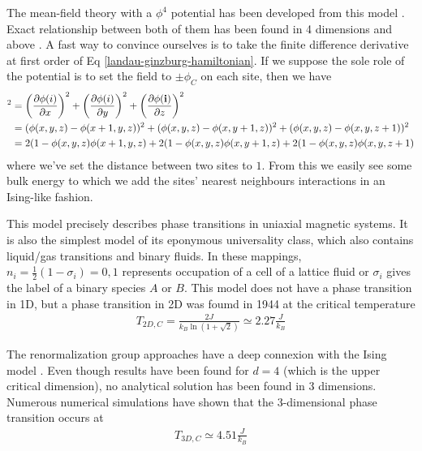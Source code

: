 The mean-field theory with a $\phi^4$ potential has been developed from this model \cite{le_bellac_equilibrium_2004}. Exact relationship between both of them has been found in 4 dimensions and above \cite{aizenman_proof_1981}. A fast way to convince ourselves is to take the finite difference derivative at first order of Eq \eqref{landau-ginzburg-hamiltonian}. If we suppose the sole role of the potential is to set the field to $\pm \phi_C$ on each site, then we have
\begin{align}
    [{\boldsymbol \nabla} \phi(i)]^2 &= \left( \frac{\partial \phi(i)}{\partial x} \right)^2  + \left( \frac{\partial \phi(i)}{\partial y} \right)^2 + \left( \frac{\partial \phi({\bf i})}{\partial z} \right)^2\nn
    &= (\phi(x,y,z)-\phi(x+1,y,z))^2 + (\phi(x,y,z)-\phi(x,y+1,z))^2 + (\phi(x,y,z)-\phi(x,y,z+1))^2 \nn
    &= 2 (1-\phi(x,y,z)\phi(x+1,y,z) + 2 (1-\phi(x,y,z)\phi(x,y+1,z) +2 (1-\phi(x,y,z)\phi(x,y,z+1) 
    \label{discretisation-landau}
\end{align}
where we've set the distance between two sites to $1$.
From this we easily see some bulk energy to which we add the sites' nearest neighbours interactions in an Ising-like fashion.

This model precisely describes  phase transitions in uniaxial magnetic systems\cite{de_jongh_experiments_1974,wold_ising_2000,ikeda_neutron_1973}. It is also the simplest model of its eponymous universality class, which also contains liquid/gas transitions and binary fluids.
In these mappings, $n_i=\frac{1}{2}(1-\sigma_i)=0,1$ represents occupation of a cell of a lattice fluid or $\sigma_i$ gives the label of a binary species $A$ or $B$.
This model does not have a phase transition in 1D, but a phase transition in 2D was foumd in 1944\cite{onsager_crystal_1944} at the critical temperature 
\begin{align}
     T_{2D,C} = \frac{2J}{k_B \ln(1 + \sqrt{2})} \simeq 2.27 \frac{J}{k_B}
\end{align}

The renormalization group approaches have a deep connexion with the Ising model \cite{frohlich_triviality_1981,goldenfeld_lectures_2018}. Even though results have been found for $d=4$ (which is the upper critical dimension), no analytical solution has been found in 3 dimensions. Numerous numerical simulations  \cite{talapov_magnetization_1996,preis_gpu_2009} have shown that the 3-dimensional phase transition occurs at 
\begin{align}
    T_{3D,C} \simeq 4.51 \frac{J}{k_B}
\end{align}


